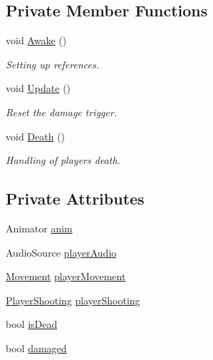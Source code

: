 \subsection*{Private Member Functions}
\begin{DoxyCompactItemize}
\item 
void \mbox{\hyperlink{class_player_health_a5de7909cbaba3f4da83878ed56e995d0}{Awake}} ()
\begin{DoxyCompactList}\small\item\em Setting up references. \end{DoxyCompactList}\item 
void \mbox{\hyperlink{class_player_health_a3c49fdd702b2cf0fca654ef6e502f311}{Update}} ()
\begin{DoxyCompactList}\small\item\em Reset the damage trigger. \end{DoxyCompactList}\item 
void \mbox{\hyperlink{class_player_health_a0a4b5c4a0184cbe9b8a5af76764cf343}{Death}} ()
\begin{DoxyCompactList}\small\item\em Handling of player\textquotesingle{}s death. \end{DoxyCompactList}\end{DoxyCompactItemize}
\subsection*{Private Attributes}
\begin{DoxyCompactItemize}
\item 
Animator \mbox{\hyperlink{class_player_health_aa3be907a776e00d9770e8dec377d2de3}{anim}}
\item 
Audio\+Source \mbox{\hyperlink{class_player_health_a51cc3bf10b2a597004e75b5c4a4bbdc1}{player\+Audio}}
\item 
\mbox{\hyperlink{class_movement}{Movement}} \mbox{\hyperlink{class_player_health_ab1b3b581903987c45280a75c5ceeb8c5}{player\+Movement}}
\item 
\mbox{\hyperlink{class_player_shooting}{Player\+Shooting}} \mbox{\hyperlink{class_player_health_a3bef2613f576b0459f43eca37b7f7f91}{player\+Shooting}}
\item 
bool \mbox{\hyperlink{class_player_health_aa96d9b4d4275452b212807786725f070}{is\+Dead}}
\item 
bool \mbox{\hyperlink{class_player_health_a11d63967da8edb7ea33b0d1f9c7ca6bd}{damaged}}
\end{DoxyCompactItemize}


